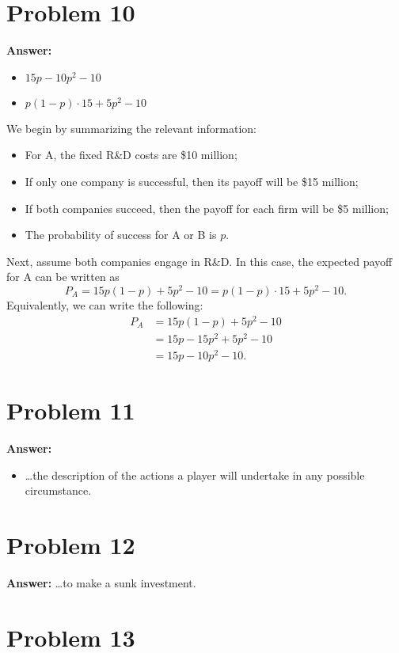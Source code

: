 \documentclass[11pt]{article}
\begin{document}
\section*{Problem 10}
\label{sec:orga34c38e}

\textbf{Answer:}
\begin{itemize}
\item \(15p-10p^2-10\)
\item \(p(1-p)\cdot15+5p^2-10\)\\
\end{itemize}

We begin by summarizing the relevant information:
\begin{itemize}
\item For A, the fixed R\&D costs are \$10 million;
\item If only one company is successful, then its payoff will be \$15 million;
\item If both companies succeed, then the payoff for each firm will be \$5
million;
\item The probability of success for A or B is \(p\).
\end{itemize}
Next, assume both companies engage in R\&D. In this case, the expected
payoff for A can be written as
\begin{equation*}
P_A=15p(1-p)+5p^2-10=p(1-p)\cdot15+5p^2-10.
\end{equation*}
Equivalently, we can write the following:
\begin{align*}
P_A&=15p(1-p)+5p^2-10\\
&=15p-15p^2+5p^2-10\\
&=15p-10p^2-10.
\end{align*}
\section*{Problem 11}
\label{sec:org24f8d90}

\textbf{Answer:}
\begin{itemize}
\item \ldots{}the description of the actions a player will undertake in any possible
circumstance.
\end{itemize}
\section*{Problem 12}
\label{sec:org9255b63}

\textbf{Answer:} \ldots{}to make a sunk investment.
\section*{Problem 13}
\label{sec:org7e72966}
\end{document}
